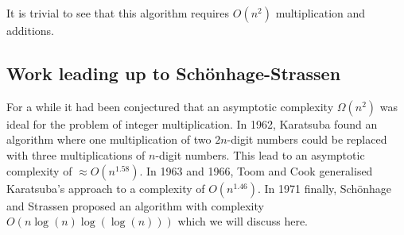 It is trivial to see that this algorithm requires $O(n^2)$ multiplication and
additions.

\subsection{Work leading up to Schönhage-Strassen}

For a while it had been conjectured that an asymptotic complexity $\Omega(n^2)$
was ideal for the problem of integer multiplication. In 1962, Karatsuba found
an algorithm where one multiplication of two $2n$-digit numbers could be
replaced with three multiplications of $n$-digit numbers. This lead to an
asymptotic complexity of $\approx O(n^{1.58})$. In 1963 and 1966, Toom and Cook
generalised Karatsuba's approach to a complexity of $O(n^{1.46})$. In 1971
finally, Schönhage and Strassen proposed an algorithm with complexity $O(n
\log(n) \log(\log(n)))$ which we will discuss
here.
